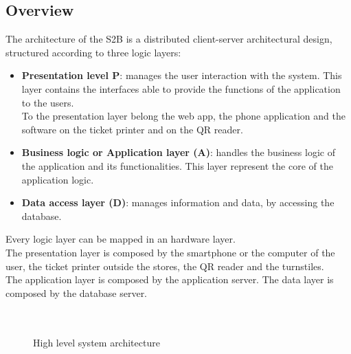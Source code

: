\subsection{Overview}
The architecture of the S2B is a distributed client-server architectural design, structured according to three logic layers:
\begin{itemize}
	\item \textbf{Presentation level P}: manages the user interaction with the system. This layer contains the interfaces able to provide the functions of the application to the users.\\
	To the presentation layer belong the web app, the phone application and the software on the ticket printer and on the QR reader.
	\item \textbf{Business logic or Application layer (A)}: handles the business logic of the application and its functionalities. This layer represent the core of the application logic.
	\item \textbf{Data access layer (D)}: manages information and data, by accessing the database.  
\end{itemize}
Every logic layer can be mapped in an hardware layer.\\
The presentation layer is composed by the smartphone or the computer of the user, the ticket printer outside the stores, the QR reader and the turnstiles.\\
The application layer is composed by the application server.
The data layer is composed by the database server.\\\\\\
\begin{figure}[H]
	\noindent
	\caption{High level system architecture} 
\end{figure}
